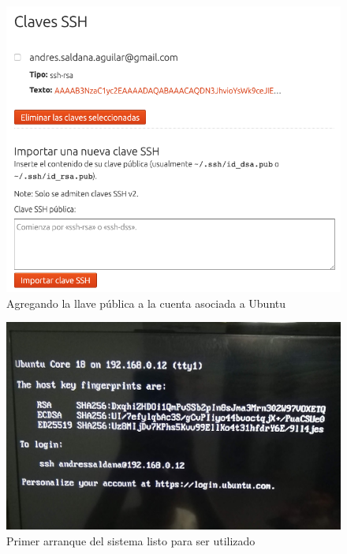 \begin{figure}[H]
	\centering
	\includegraphics[scale=.3]{Capitulo5/images/sshkey.png}
	\caption{Agregando la llave pública a la cuenta asociada a Ubuntu}
	\label{fig:ubuntullave}
\end{figure} 

\begin{figure}[H]
	\centering
	\includegraphics[scale=.15]{Capitulo5/images/first_boot.jpg}
	\caption{Primer arranque del sistema listo para ser utilizado}
	\label{fig:primer arranque}
\end{figure} 

